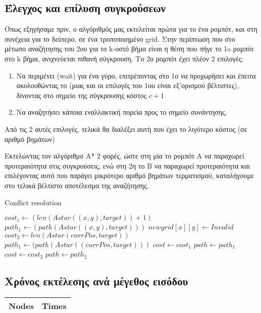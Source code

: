 \documentclass[a4paper,9pt]{article}
\begin{document}
\subsection{Έλεγχος και επίλυση συγκρούσεων}
Όπως εξηγήσαμε πριν, ο αλγόριθμός μας εκτελείται πρώτα για το ένα ρομπότ, και
στη συνέχεια για το δεύτερο, σε ένα τροποποιημένο grid. Στην περίπτωση που στο
μέτωπο αναζήτησης του 2ου για το k-οστό βήμα είναι η θέση που πήγε το 1o
ρομπότ στο k βήμα, ανιχνεύεται πιθανή σύγκρουση. Το 2ο ρομπότ έχει πλέον 2
επιλογές:
\begin{enumerate}
    \item Να περιμένει (wait) για ένα γύρο, επιτρέποντας στο 1ο να προχωρήσει
    και έπειτα ακολουθώντας το (μιας και οι επιλογές του 1ου είναι εξ'ορισμού
    βέλτιστες), δίνοντας στο σημείο της σύγκρουσης κόστος $c+1$
    \item Να αναζητήσει κάποια εναλλακτική πορεία προς το σημείο συνάντησης.
\end{enumerate}
Από τις 2 αυτές επιλογές, τελικά θα διαλέξει αυτή που έχει το λιγότερο κόστος
(σε αριθμό βημάτων)

Εκτελώντας τον αλγόριθμο A* 2 φορές, ώστε στη μία το ρομπότ A να παραχωρεί
προτεραιότητα στις συγκρούσεις, ενώ στη 2η το Β να παραχωρεί προτεραιότητα και
επιλέγοντας αυτό που παράγει μικρότερο αριθμό βημάτων τερματισμού, καταλήγουμε
στο τελικά βέλτιστο αποτέλεσμα της αναζήτησης.

\begin{algorithm}[H]
\caption{Conflict resolution}
\begin{algorithmic}[1]
	\State $cost_1 \gets (len(Astar((x,y), target)) + 1)$
	\State $path_1 \gets (path(Astar((x,y), target)))$
	\State $newgrid[x][y] \gets Invalid$
	\State $cost_2 \gets len(Astar(currPos, target))$
	\State $path_1 \gets (path(Astar((currPos, target)))$
	    \State $cost \gets cost_1$
	    \State $path \gets path_1$
	\Else
	    \State $cost \gets cost_2$
	    \State $path \gets path_2$
	\EndIf
    \EndIf
\EndProcedure
\end{algorithmic}
\end{algorithm}

\subsection{Χρόνος εκτέλεσης ανά μέγεθος εισόδου}

\begin{minipage}{0.4\textwidth}
	\begin{tabular}{ | l | l |}
		\hline
		Nodes & Times \\
		\hline 
		\hline 

		
	\end{tabular}
	\end{minipage}
\end{document}

